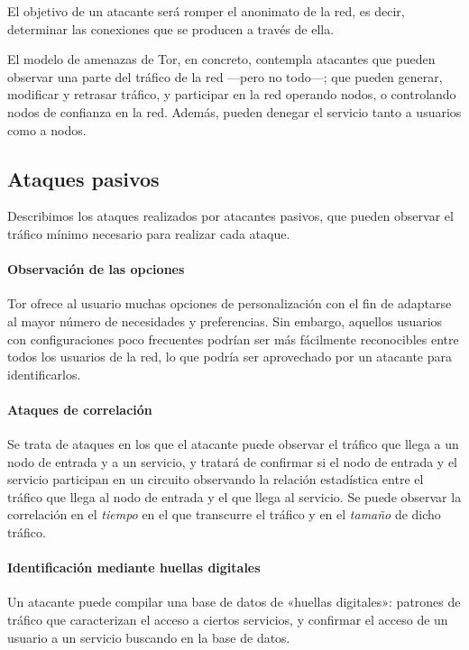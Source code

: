 \documentclass[
  a4paper,
  12pt,
  spanish,
]{scrartcl}
\begin{document}
El objetivo de un atacante será romper el anonimato de la red, es decir, determinar las conexiones
que se producen a través de ella.

El modelo de amenazas de Tor, en concreto, contempla atacantes que pueden observar una parte del tráfico
de la red ---pero no todo---; que pueden generar, modificar y retrasar tráfico, y participar en la red
operando nodos, o controlando nodos de confianza en la red. Además, pueden denegar el servicio tanto a usuarios
como a nodos.

\subsection{Ataques pasivos}

Describimos los ataques realizados por atacantes pasivos, que pueden observar el tráfico mínimo necesario para realizar cada ataque.

\paragraph{Observación de las opciones}

Tor ofrece al usuario muchas opciones de personalización con el fin de adaptarse al mayor número de necesidades y preferencias. 
Sin embargo, aquellos usuarios con configuraciones poco frecuentes podrían ser más fácilmente reconocibles entre todos los usuarios de la red, lo que podría ser aprovechado por un atacante para identificarlos.

\paragraph{Ataques de correlación}

Se trata de ataques en los que el atacante puede observar el tráfico que llega a
un nodo de entrada y a un servicio, y tratará de confirmar si el nodo de entrada
y el servicio participan en un circuito observando la relación estadística entre
el tráfico que llega al nodo de entrada y el que llega al servicio. Se puede
observar la correlación en el \emph{tiempo} en el que transcurre el tráfico y en
el \emph{tamaño} de dicho tráfico.

\paragraph{Identificación mediante huellas digitales}

Un atacante puede compilar una base de datos de «huellas digitales»: patrones de
tráfico que caracterizan el acceso a ciertos servicios, y confirmar el acceso de
un usuario a un servicio buscando en la base de datos.
\end{document}
